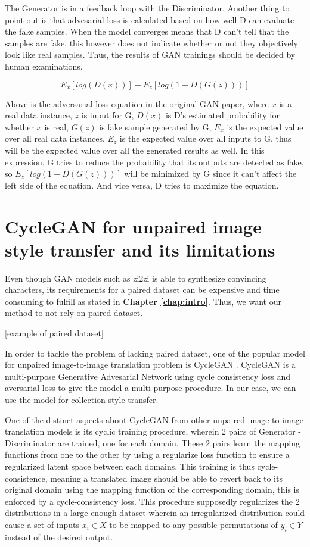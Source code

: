 \documentclass[12pt]{report}
\begin{document}
The Generator is in a feedback loop with the Discriminator. Another thing to point out is that advesarial loss is calculated based on how well D can evaluate the fake samples. When the model converges means that D can't tell that the samples are fake, this however does not indicate whether or not they objectively look like real samples. Thus, the results of GAN trainings should be decided by human examinations.

\[E_x[log(D(x))] + E_z[log(1 - D(G(z)))]\]

Above is the adversarial loss equation in the original GAN paper, where $x$ is a real data instance, $z$ is input for G, $D(x)$ is D's estimated probability for whether $x$ is real, $G(z)$ is fake sample generated by G, $E_x$ is the expected value over all real data instances, $E_z$ is the expected value over all inputs to G, thus will be the expected value over all the generated results as well. In this expression, G tries to reduce the probability that its outputs are detected as fake, so $E_z[log(1-D(G(z)))]$ will be minimized by G since it can't affect the left side of the equation. And vice versa, D tries to maximize the equation.

\section{CycleGAN for unpaired image style transfer and its limitations}

Even though GAN models such as zi2zi \cite{zi2zi} is able to synthesize convincing characters, its requirements for a paired dataset can be expensive and time consuming to fulfill as stated in \textbf{Chapter \ref{chap:intro}}. Thus, we want our method to not rely on paired dataset. 

[example of paired dataset]

In order to tackle the problem of lacking paired dataset, one of the popular model for unpaired image-to-image translation problem is CycleGAN \cite{cycle-gan}. CycleGAN is a multi-purpose Generative Advesarial Network using cycle consistency loss and aversarial loss to give the model a multi-purpose procedure. In our case, we can use the model for collection style transfer.

One of the distinct aspects about CycleGAN\cite{cycle-gan} from other unpaired image-to-image translation models is its cyclic training procedure, wherein 2 pairs of Generator - Discriminator are trained, one for each domain. These 2 pairs learn the mapping functions from one to the other by using a regularize loss function to ensure a regularized latent space between each domains. This training is thus cycle-consistence, meaning a translated image should be able to revert back to its original domain using the mapping function of the corresponding domain, this is enforced by a cycle-consistency loss. This procedure supposedly regularizes the 2 distributions in a large enough dataset wherein an irregularized distribution could cause a set of inputs $x_i$$\in$$X$ to be mapped to any possible permutations of $y_i$$\in$$Y$ instead of the desired output.
\end{document}
